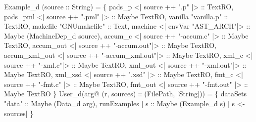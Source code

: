 \begin{code}
  Example_d (source :: String) =  \{
   pads_p         <| source ++ ".p" |>            :: TextRO,         
   pads_pml       <| source ++ ".pml" |>          :: Maybe TextRO,   
   vanilla        "vanilla.p"                     :: TextRO,         
   makefile       "GNUmakefile"                   :: Text,           
   machine        <| envVar "AST_ARCH"|>          :: Maybe (MachineDep_d source),   
   accum_c        <| source ++ "-accum.c" |>      :: Maybe TextRO,   
   accum_out      <| source ++ "-accum.out"|>     :: Maybe TextRO,   
   accum_xml_out  <| source ++ "-accum_xml.out"|> :: Maybe TextRO,   
   xml_c          <| source ++ "-xml.c"|>         :: Maybe TextRO,   
   xml_out        <| source ++ "-xml.out"|>       :: Maybe TextRO,   
   xml_xsd        <| source ++ ".xsd" |>          :: Maybe TextRO,   
   fmt_c          <| source ++ "-fmt.c" |>        :: Maybe TextRO,   
   fmt_out        <| source ++ "-fmt.out" |>      :: Maybe TextRO    
 \}
\mbox{}
  User_d(arg@ (r, sources) :: (FilePath, [String])) =  \{
    dataSets    "data"    :: Maybe (Data_d arg),
    runExamples       [ s :: Maybe (Example_d s) | s <- sources]
  \}
\end{code}

